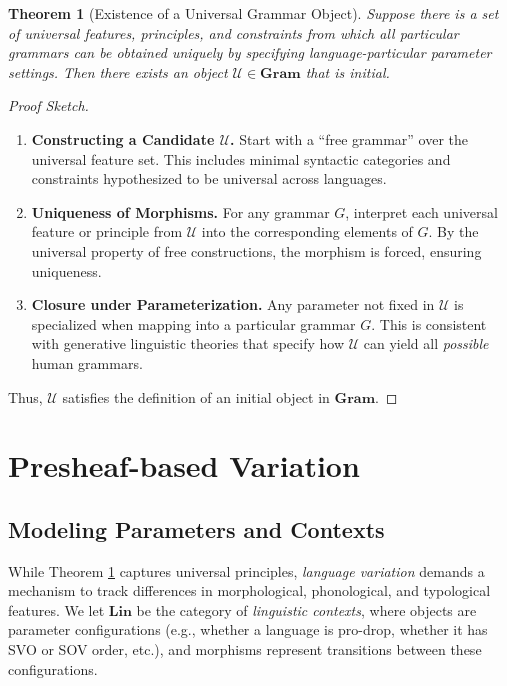 \documentclass[12pt]{article}
\theoremstyle{plain}
\newtheorem{theorem}{Theorem}[section]
\theoremstyle{definition}
\begin{document}
\begin{theorem}[Existence of a Universal Grammar Object]\label{thm:UG}
Suppose there is a set of universal features, principles, and constraints from which all particular grammars can be obtained uniquely by specifying language-particular parameter settings. Then there exists an object \(\mathcal{U} \in \mathbf{Gram}\) that is initial.
\end{theorem}

\begin{proof}[Proof Sketch]
\ 
\begin{enumerate}
    \item \textbf{Constructing a Candidate \(\mathcal{U}\).} Start with a “free grammar” over the universal feature set. This includes minimal syntactic categories and constraints hypothesized to be universal across languages.
    \item \textbf{Uniqueness of Morphisms.} For any grammar \(G\), interpret each universal feature or principle from \(\mathcal{U}\) into the corresponding elements of \(G\). By the universal property of free constructions, the morphism is forced, ensuring uniqueness.
    \item \textbf{Closure under Parameterization.} Any parameter not fixed in \(\mathcal{U}\) is specialized when mapping into a particular grammar \(G\). This is consistent with generative linguistic theories that specify how \(\mathcal{U}\) can yield all \emph{possible} human grammars.
\end{enumerate}
Thus, \(\mathcal{U}\) satisfies the definition of an initial object in \(\mathbf{Gram}\).
\end{proof}

\section{Presheaf-based Variation}
\subsection{Modeling Parameters and Contexts}
While Theorem \ref{thm:UG} captures universal principles, \emph{language variation} demands a mechanism to track differences in morphological, phonological, and typological features. We let \(\mathbf{Lin}\) be the category of \emph{linguistic contexts}, where objects are parameter configurations (e.g., whether a language is pro-drop, whether it has SVO or SOV order, etc.), and morphisms represent transitions between these configurations.
\end{document}
